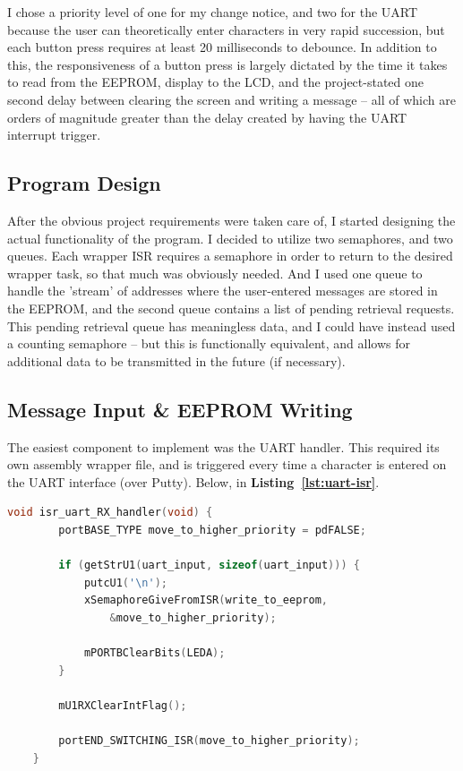 \documentclass[a4paper, 12pt]{article}
\begin{document}
I chose a priority level of one for my change notice, and two for the UART because the user can theoretically enter characters in very rapid succession, but each button press requires at least 20 milliseconds to debounce. In addition to this, the responsiveness of a button press is largely dictated by the time it takes to read from the EEPROM, display to the LCD, and the project-stated one second delay between clearing the screen and writing a message -- all of which are orders of magnitude greater than the delay created by having the UART interrupt trigger.

\subsection{Program Design}
After the obvious project requirements were taken care of, I started designing the actual functionality of the program. I decided to utilize two semaphores, and two queues. Each wrapper ISR requires a semaphore in order to return to the desired wrapper task, so that much was obviously needed. And I used one queue to handle the 'stream' of addresses where the user-entered messages are stored in the EEPROM, and the second queue contains a list of pending retrieval requests. This pending retrieval queue has meaningless data, and I could have instead used a counting semaphore -- but this is functionally equivalent, and allows for additional data to be transmitted in the future (if necessary).

\subsection{Message Input \& EEPROM Writing}
The easiest component to implement was the UART handler. This required its own assembly wrapper file, and is triggered every time a character is entered on the UART interface (over Putty). Below, in \textbf{Listing~\ref{lst:uart-isr}}.

	\begin{mdframed}[backgroundcolor=code-gray, roundcorner=10pt,
								innerleftmargin=5, innertopmargin=5, innerbottommargin=5]	
	\begin{lstlisting}[language=C, caption=UART ISR Handler, tabsize=2, label={lst:uart-isr}]
	void isr_uart_RX_handler(void) {
		portBASE_TYPE move_to_higher_priority = pdFALSE;

		if (getStrU1(uart_input, sizeof(uart_input))) {
			putcU1('\n');
			xSemaphoreGiveFromISR(write_to_eeprom,
				&move_to_higher_priority);
			
			mPORTBClearBits(LEDA);
		}	

		mU1RXClearIntFlag();
	
		portEND_SWITCHING_ISR(move_to_higher_priority);
	}
	\end{lstlisting}
	\end{mdframed}
	
\end{document}
